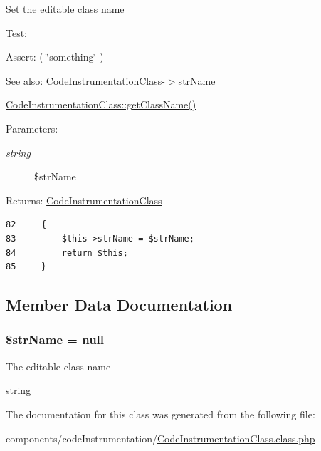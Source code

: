 Set the editable class name

\begin{Desc}
\item[Test:]\end{Desc}
\small{}
\normalsize 


\begin{Desc}
\item[Assert:]( \char`\"{}something\char`\"{} )\end{Desc}
\begin{Desc}
\item[See also:]CodeInstrumentationClass-$>$strName 

\hyperlink{class_code_instrumentation_class_b8f8ee56588ebf5091c288e44ebdfaf4}{CodeInstrumentationClass::getClassName()} \end{Desc}
\begin{Desc}
\item[Parameters:]
\begin{description}
\item[{\em string}]\$strName \end{description}
\end{Desc}
\begin{Desc}
\item[Returns:]\hyperlink{class_code_instrumentation_class}{CodeInstrumentationClass} \end{Desc}


\begin{Code}\begin{verbatim}82     {
83         $this->strName = $strName;
84         return $this;
85     }
\end{verbatim}
\end{Code}




\subsection{Member Data Documentation}
\hypertarget{class_code_instrumentation_class_90edf7538a74be8ac5ce46baaf203382}{
\subsubsection[{\$strName}]{\setlength{\rightskip}{0pt plus 5cm}\$strName = null}}
\label{class_code_instrumentation_class_90edf7538a74be8ac5ce46baaf203382}


The editable class name

string 

The documentation for this class was generated from the following file:\begin{CompactItemize}
\item 
components/codeInstrumentation/\hyperlink{_code_instrumentation_class_8class_8php}{CodeInstrumentationClass.class.php}\end{CompactItemize}
